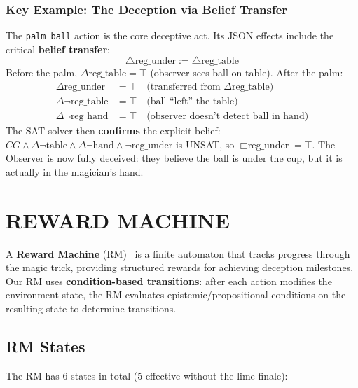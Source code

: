 \documentclass[letterpaper, 10 pt, conference]{ieeeconf}  %
\newcommand{\EBel}[1]{\ensuremath{\Delta #1}} %
\newcommand{\IBel}[1]{\ensuremath{\Box #1}}   %
\newcommand{\CG}{\ensuremath{\mathit{CG}}}    %
\begin{document}
\subsubsection*{Key Example: The Deception via Belief Transfer}
The \texttt{palm\_ball} action is the core deceptive act. Its JSON effects include the critical \textbf{belief transfer}:
\[
    \triangle\text{reg\_under} := \triangle\text{reg\_table}
\]
Before the palm, $\EBel{\text{reg\_table}} = \top$ (observer sees ball on table). After the palm:
\begin{align*}
    \EBel{\text{reg\_under}} &= \top \quad \text{(transferred from } \EBel{\text{reg\_table}}\text{)} \\
    \EBel{\neg\text{reg\_table}} &= \top \quad \text{(ball ``left'' the table)} \\
    \EBel{\neg\text{reg\_hand}} &= \top \quad \text{(observer doesn't detect ball in hand)}
\end{align*}
The SAT solver then \textbf{confirms} the explicit belief: $\CG \land \EBel{\neg\text{table}} \land \EBel{\neg\text{hand}} \land \neg\text{reg\_under}$ is UNSAT, so $\IBel{\text{reg\_under}} = \top$. The Observer is now fully deceived: they believe the ball is under the cup, but it is actually in the magician's hand.

\addtolength{\textheight}{-3cm}   %

\section{REWARD MACHINE}

A \textbf{Reward Machine} (RM)~\cite{icarte2018} is a finite automaton that tracks progress through the magic trick, providing structured rewards for achieving deception milestones. Our RM uses \textbf{condition-based transitions}: after each action modifies the environment state, the RM evaluates epistemic/propositional conditions on the resulting state to determine transitions.

\subsection{RM States}

The RM has 6 states in total (5 effective without the lime finale):
\end{document}
